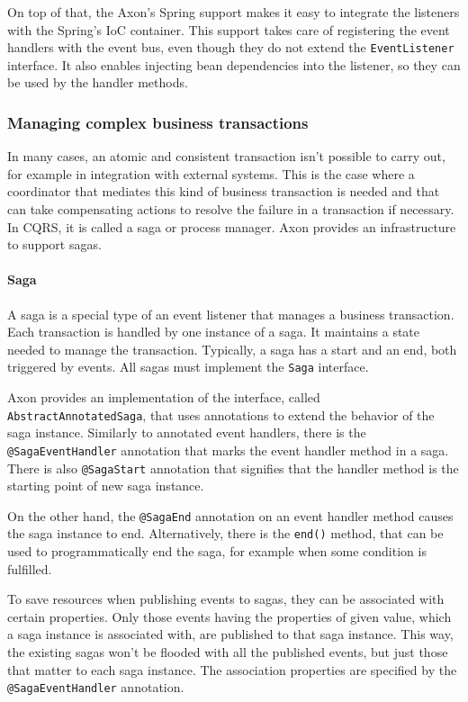 \documentclass{book}
\begin{document}
On top of that, the Axon's Spring support makes it easy to integrate the
listeners with the Spring's IoC container. This support takes care of
registering the event handlers with the event bus, even though they do
not extend the \texttt{EventListener} interface. It also enables
injecting bean dependencies into the listener, so they can be used by
the handler methods.


\subsubsection{Managing complex business
transactions}\label{managing-complex-business-transactions}

In many cases, an atomic and consistent transaction isn't possible to
carry out, for example in integration with external systems. This is the
case where a coordinator that mediates this kind of business transaction
is needed and that can take compensating actions to resolve the failure
in a transaction if necessary. In CQRS, it is called a saga or process
manager. Axon provides an infrastructure to support sagas.

\paragraph{Saga}\label{saga}

A saga is a special type of an event listener that manages a business
transaction. Each transaction is handled by one instance of a saga. It
maintains a state needed to manage the transaction. Typically, a saga
has a start and an end, both triggered by events. All sagas must
implement the \texttt{Saga} interface.

Axon provides an implementation of the interface, called
\texttt{AbstractAnnotatedSaga}, that uses annotations to extend the
behavior of the saga instance. Similarly to annotated event handlers,
there is the \texttt{@SagaEventHandler} annotation that marks the event
handler method in a saga. There is also \texttt{@SagaStart} annotation
that signifies that the handler method is the starting point of new saga
instance.

On the other hand, the \texttt{@SagaEnd} annotation on an event handler
method causes the saga instance to end. Alternatively, there is the
\texttt{end()} method, that can be used to programmatically end the
saga, for example when some condition is fulfilled.

To save resources when publishing events to sagas, they can be
associated with certain properties. Only those events having the
properties of given value, which a saga instance is associated with, are
published to that saga instance. This way, the existing sagas won't be
flooded with all the published events, but just those that matter to
each saga instance. The association properties are specified by the
\texttt{@SagaEventHandler} annotation.
\end{document}
